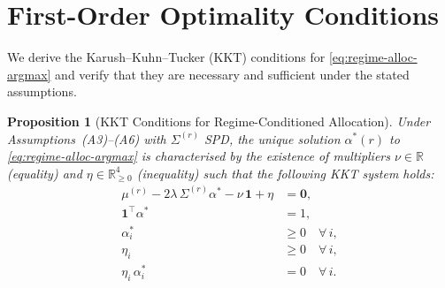 \documentclass[12pt,openany]{book}
\newcommand{\R}{\mathbb{R}}
\numberwithin{equation}{chapter}
\theoremstyle{plain}
\newtheorem{proposition}[theorem]{Proposition}
\theoremstyle{definition}
\theoremstyle{remark}
\numberwithin{equation}{chapter}
\theoremstyle{plain}
\begin{document}
\section{First-Order Optimality Conditions}
\label{sec:kkt-alloc}

\noindent We derive the Karush--Kuhn--Tucker (KKT) conditions for
\eqref{eq:regime-alloc-argmax} and verify that they are necessary and
sufficient under the stated assumptions.

\begin{proposition}[KKT Conditions for Regime-Conditioned Allocation]
\label{prop:kkt-alloc}
Under Assumptions~(A3)--(A6) with $\Sigma^{(r)}$ SPD, the unique
solution $\alpha^{*}(r)$ to \eqref{eq:regime-alloc-argmax} is
characterised by the existence of multipliers
$\nu \in \R$ (equality) and $\eta \in \R_{\geq 0}^{4}$ (inequality)
such that the following KKT system holds:
\begin{align}
  \mu^{(r)} - 2\lambda\,\Sigma^{(r)}\alpha^{*}
  - \nu\,\mathbf{1} + \eta &= \mathbf{0},
  \label{eq:kkt-stat} \\
  \mathbf{1}^\top \alpha^{*} &= 1,
  \label{eq:kkt-eq} \\
  \alpha^{*}_i &\geq 0 \quad \forall\,i,
  \label{eq:kkt-prim} \\
  \eta_i &\geq 0 \quad \forall\,i,
  \label{eq:kkt-dual} \\
  \eta_i\,\alpha^{*}_i &= 0 \quad \forall\,i.
  \label{eq:kkt-cs}
\end{align}
\end{proposition}
\end{document}
